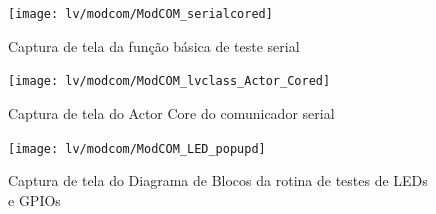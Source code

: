         
        \begin{figure}
                \centering
                 \texttt{[image: lv/modcom/ModCOM\_serialcored]}
                \caption{Captura de tela da função básica de teste serial}
                \label{fig:serialcored}
        \end{figure}
        
        \begin{figure}
                \centering
                 \texttt{[image: lv/modcom/ModCOM\_lvclass\_Actor\_Cored]}
                \caption{Captura de tela do Actor Core do comunicador serial}
                \label{fig:modcomcore}
        \end{figure}
        
        \begin{figure}
                \centering
                 \texttt{[image: lv/modcom/ModCOM\_LED\_popupd]}
                \caption{Captura de tela do Diagrama de Blocos da rotina de testes de LEDs e GPIOs}
                \label{fig:modcomledd}
        \end{figure}
        
        
        
